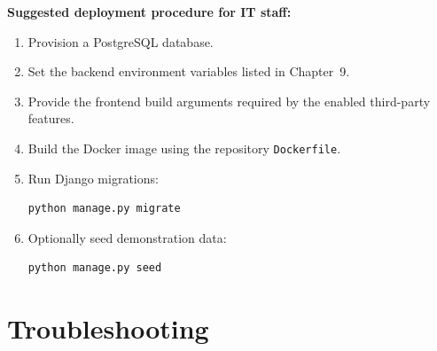 \documentclass[a4paper, 12pt]{report}
\begin{document}
\textbf{Suggested deployment procedure for IT staff:}
\begin{enumerate}
    \item Provision a PostgreSQL database.
    \item Set the backend environment variables listed in Chapter~9.
    \item Provide the frontend build arguments required by the enabled
          third-party features.
    \item Build the Docker image using the repository \texttt{Dockerfile}.
    \item Run Django migrations:
\begin{lstlisting}[language=bash]
python manage.py migrate
\end{lstlisting}
    \item Optionally seed demonstration data:
\begin{lstlisting}[language=bash]
python manage.py seed
\end{lstlisting}
\end{enumerate}

\chapter{Troubleshooting}
\end{document}

